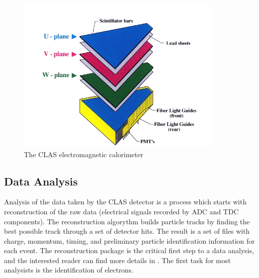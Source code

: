 \begin{figure}
  \centering
  \includegraphics[width=10cm]{image/ec.png}
  \caption{The CLAS electromagnetic calorimeter}
  \label{fig:ec_clas}
\end{figure}

\subsection{Data Analysis}
Analysis of the data taken by the CLAS detector is a process which starts with reconstruction of the raw data (electrical signals recorded by ADC and TDC components).  The reconstruction algorythm builds particle tracks by finding the best possible track through a set of detector hits.  The result is a set of files with charge, momentum, timing, and preliminary particle identification information for each event.  The reconstruction package is the critical first step to a data analysis, and the interested reader can find more details in \cite{reconstruction-doc}.  The first task for most analysists is the identification of electrons.

